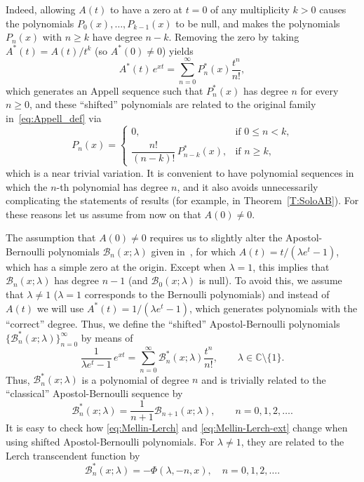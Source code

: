 \documentclass[11pt,a4paper]{amsart}
\newcommand{\C}{\mathbb{C}}
\newcommand{\AB}{\mathcal{B}}
\theoremstyle{plain}
\theoremstyle{plain}
\theoremstyle{plain}
\theoremstyle{remark}
\begin{document}
Indeed, allowing $A(t)$ to have a zero at $t = 0$ of any multiplicity $k > 0$ causes the polynomials $P_0(x),\dots,P_{k-1}(x)$ to be null, and makes the polynomials $P_n(x)$ with $n \ge k$ have degree $n-k$.
Removing the zero by taking $A^*(t) = A(t)/t^k$ (so $A^*(0) \ne 0$) yields
\[
  A^*(t) \, e^{xt} = \sum_{n=0}^\infty P^*_{n}(x)\frac{t^n}{n!},
\]
which generates an Appell sequence such that $P^*_{n}(x)$ has degree $n$ for every $n \ge 0$, and these ``shifted'' polynomials are related to the original family in~\eqref{eq:Appell_def} via
\begin{equation*}
  P_{n}(x) = \begin{cases}
    0,                                    &\text{if $0 \leq n < k$,}
    \\[1ex]
    \dfrac{n!}{(n-k)!} \, P^{*}_{n-k}(x), &\text{if $n \geq k$,}
  \end{cases}
\end{equation*}
which is a near trivial variation. It is convenient to have polynomial sequences in which the $n$-th polynomial has degree $n$, and it also avoids unnecessarily complicating the statements of results (for example, in Theorem~\ref{T:SoloAB}). For these reasons let us assume from now on that $A(0) \ne 0$.

The assumption that $A(0) \neq 0$ requires us to slightly alter the Apostol-Bernoulli polynomials $\AB_n(x;\lambda)$ given in~\cite{Ap}, for which $A(t)=t/(\lambda e^t-1)$, which has a simple zero at the origin. Except when $\lambda=1$, this implies that $\AB_n(x;\lambda)$ has degree $n-1$ (and $\AB_0(x;\lambda)$ is null). To avoid this, we assume that $\lambda \ne 1$ ($\lambda=1$ corresponds to the Bernoulli polynomials) and instead of $A(t)$ we will use $A^*(t)=1/(\lambda e^t-1)$, which generates polynomials with the ``correct'' degree. Thus, we define the ``shifted'' Apostol-Bernoulli polynomials $\{\AB^*_n(x;\lambda)\}_{n=0}^{\infty}$ by means of
\begin{equation*}
  \frac{1}{\lambda e^t-1} \, e^{xt} = \sum_{n=0}^\infty \AB^*_n(x;\lambda) \frac{t^n}{n!},
  \qquad \lambda \in \C \setminus \{1\}.
\end{equation*}
Thus, $\AB^*_n(x;\lambda)$ is a polynomial of degree $n$ and is trivially related to the ``classical'' Apostol-Bernoulli sequence by
\[
  \AB^*_n(x;\lambda) = \frac{1}{n+1} \AB_{n+1}(x;\lambda), \qquad n = 0, 1, 2,\dots.
\]
It is easy to check how \eqref{eq:Mellin-Lerch} and \eqref{eq:Mellin-Lerch-ext} change when using shifted Apostol-Bernoulli polynomials. For $\lambda\ne1$, they are related to the Lerch transcendent function by
\begin{equation}
\label{eq:shiftedABL}
  \AB^*_n(x;\lambda) = - \Phi(\lambda,-n,x),\quad n=0,1,2,\dots.
\end{equation}
\end{document}
